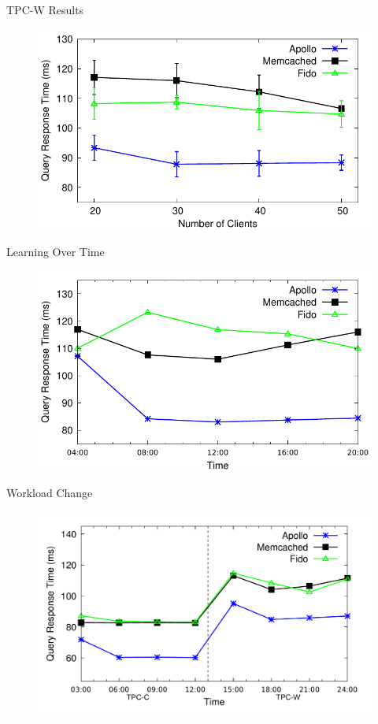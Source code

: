 \documentclass[10pt]{beamer}
\begin{document}
\begin{frame}[fragile]{TPC-W Results}
    \begin{figure}
        \center
        \includegraphics[scale=0.7]{apollo_tpcw}
    \end{figure}
\end{frame}

\begin{frame}[fragile]{Learning Over Time}
    \begin{figure}
        \center
        \includegraphics[scale=0.7]{apollo_30_intervals}
    \end{figure}
\end{frame}

\begin{frame}[fragile]{Workload Change}
    \begin{figure}
        \center
        \includegraphics[scale=0.11]{apollo_wl_change}
    \end{figure}
\end{frame}
\end{document}
